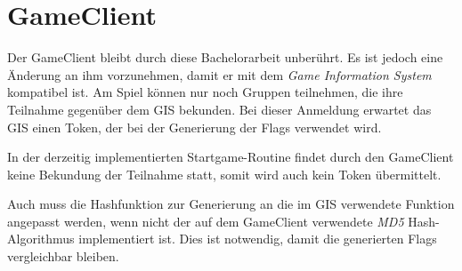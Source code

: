\section{GameClient} \label{sec:GameClient}
Der GameClient bleibt durch diese Bachelorarbeit unberührt. Es ist jedoch eine Änderung an ihm vorzunehmen, damit er mit dem \textit{Game Information System} kompatibel ist.
Am Spiel können nur noch Gruppen teilnehmen, die ihre Teilnahme gegenüber dem GIS bekunden. Bei dieser Anmeldung erwartet das GIS einen Token, der bei der Generierung der Flags verwendet wird. 

In der derzeitig implementierten Startgame-Routine findet durch den GameClient keine Bekundung der Teilnahme statt, somit wird auch kein Token übermittelt.

Auch muss die Hashfunktion zur Generierung an die im GIS verwendete Funktion angepasst werden, wenn nicht der auf dem GameClient verwendete \textit{MD5} Hash-Algorithmus implementiert ist. Dies ist notwendig, damit die generierten Flags vergleichbar bleiben.